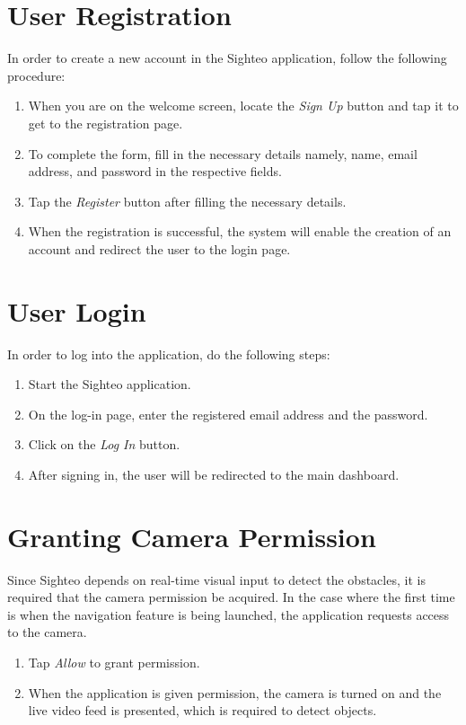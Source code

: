\documentclass{FastFyp}
\begin{document}
\section{User Registration}

In order to create a new account in the Sighteo application, follow the following procedure:

\begin{enumerate}
\item When you are on the welcome screen, locate the \textit{Sign Up} button and tap it to get to the registration page.
\item To complete the form, fill in the necessary details namely, name, email address, and password in the respective fields.
\item Tap the \textit{Register} button after filling the necessary details.
\item When the registration is successful, the system will enable the creation of an account and redirect the user to the login page.
\end{enumerate}

\section{User Login}

In order to log into the application, do the following steps:

\begin{enumerate}
\item Start the Sighteo application.
\item On the log-in page, enter the registered email address and the password.
\item Click on the \textit{Log In} button.
\item After signing in, the user will be redirected to the main dashboard.
\end{enumerate}

\section{Granting Camera Permission}

Since Sighteo depends on real-time visual input to detect the obstacles, it is required that the camera permission be acquired. In the case where the first time is when the navigation feature is being launched, the application requests access to the camera.

\begin{enumerate}
\item Tap \textit{Allow} to grant permission.
\item When the application is given permission, the camera is turned on and the live video feed is presented, which is required to detect objects.
\end{enumerate}
\end{document}

